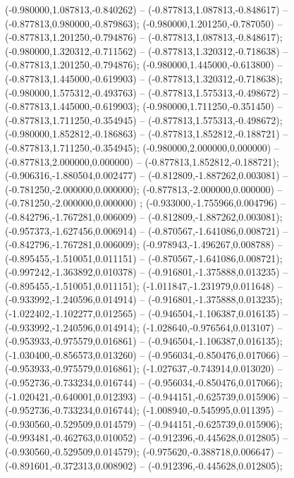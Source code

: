  (-0.980000,1.087813,-0.840262) -- (-0.877813,1.087813,-0.848617) -- (-0.877813,0.980000,-0.879863);
 (-0.980000,1.201250,-0.787050) -- (-0.877813,1.201250,-0.794876) -- (-0.877813,1.087813,-0.848617);
 (-0.980000,1.320312,-0.711562) -- (-0.877813,1.320312,-0.718638) -- (-0.877813,1.201250,-0.794876);
 (-0.980000,1.445000,-0.613800) -- (-0.877813,1.445000,-0.619903) -- (-0.877813,1.320312,-0.718638);
 (-0.980000,1.575312,-0.493763) -- (-0.877813,1.575313,-0.498672) -- (-0.877813,1.445000,-0.619903);
 (-0.980000,1.711250,-0.351450) -- (-0.877813,1.711250,-0.354945) -- (-0.877813,1.575313,-0.498672);
 (-0.980000,1.852812,-0.186863) -- (-0.877813,1.852812,-0.188721) -- (-0.877813,1.711250,-0.354945);
 (-0.980000,2.000000,0.000000) -- (-0.877813,2.000000,0.000000) -- (-0.877813,1.852812,-0.188721);
 (-0.906316,-1.880504,0.002477) -- (-0.812809,-1.887262,0.003081) -- (-0.781250,-2.000000,0.000000);
 (-0.877813,-2.000000,0.000000) -- (-0.781250,-2.000000,0.000000) ;
 (-0.933000,-1.755966,0.004796) -- (-0.842796,-1.767281,0.006009) -- (-0.812809,-1.887262,0.003081);
 (-0.957373,-1.627456,0.006914) -- (-0.870567,-1.641086,0.008721) -- (-0.842796,-1.767281,0.006009);
 (-0.978943,-1.496267,0.008788) -- (-0.895455,-1.510051,0.011151) -- (-0.870567,-1.641086,0.008721);
 (-0.997242,-1.363892,0.010378) -- (-0.916801,-1.375888,0.013235) -- (-0.895455,-1.510051,0.011151);
 (-1.011847,-1.231979,0.011648) -- (-0.933992,-1.240596,0.014914) -- (-0.916801,-1.375888,0.013235);
 (-1.022402,-1.102277,0.012565) -- (-0.946504,-1.106387,0.016135) -- (-0.933992,-1.240596,0.014914);
 (-1.028640,-0.976564,0.013107) -- (-0.953933,-0.975579,0.016861) -- (-0.946504,-1.106387,0.016135);
 (-1.030400,-0.856573,0.013260) -- (-0.956034,-0.850476,0.017066) -- (-0.953933,-0.975579,0.016861);
 (-1.027637,-0.743914,0.013020) -- (-0.952736,-0.733234,0.016744) -- (-0.956034,-0.850476,0.017066);
 (-1.020421,-0.640001,0.012393) -- (-0.944151,-0.625739,0.015906) -- (-0.952736,-0.733234,0.016744);
 (-1.008940,-0.545995,0.011395) -- (-0.930560,-0.529509,0.014579) -- (-0.944151,-0.625739,0.015906);
 (-0.993481,-0.462763,0.010052) -- (-0.912396,-0.445628,0.012805) -- (-0.930560,-0.529509,0.014579);
 (-0.975620,-0.388718,0.006647) -- (-0.891601,-0.372313,0.008902) -- (-0.912396,-0.445628,0.012805);
